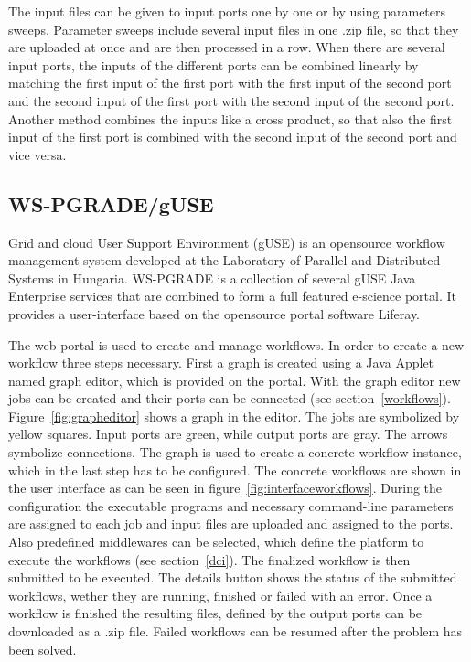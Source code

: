 The input files can be given to input ports one by one or by using parameters sweeps.
Parameter sweeps include several input files in one .zip file, so that they are uploaded at once and are then processed in a row.
When there are several input ports, the inputs of the different ports can be combined linearly by matching the first input of the first port with the first input of the second port and the second input of the first port with the second input of the second port.
Another method combines the inputs like a cross product, so that also the first input of the first port is combined with the second input of the second port and vice versa.

\subsection{WS-PGRADE/gUSE}\label{guse}

Grid and cloud User Support Environment (gUSE) is an opensource workflow management system developed at the Laboratory of Parallel and Distributed Systems in Hungaria.
WS-PGRADE is a collection of several gUSE Java Enterprise services that are combined to form a full featured e-science portal.
It provides a user-interface based on the opensource portal software Liferay.

The web portal is used to create and manage workflows. In order to create a new workflow three steps necessary. First a graph is created using a Java Applet named graph editor, which is provided on the portal. With the graph editor new jobs can be created and their ports can be connected (see section~\ref{workflows}). Figure~\ref{fig:grapheditor} shows a graph in the editor. The jobs are symbolized by yellow squares. Input ports are green, while output ports are gray. The arrows symbolize connections.
The graph is used to create a concrete workflow instance, which in the last step has to be configured.
The concrete workflows are shown in the user interface as can be seen in figure~\ref{fig:interfaceworkflows}.
During the configuration the executable programs and necessary command-line parameters are assigned to each job and input files are uploaded and assigned to the ports.
Also predefined middlewares can be selected, which define the platform to execute the workflows (see section~\ref{dci}).
The finalized workflow is then submitted to be executed.
The details button shows the status of the submitted workflows, wether they are running, finished or failed with an error.
Once a workflow is finished the resulting files, defined by the output ports can be downloaded as a .zip file.
Failed workflows can be resumed after the problem has been solved.

